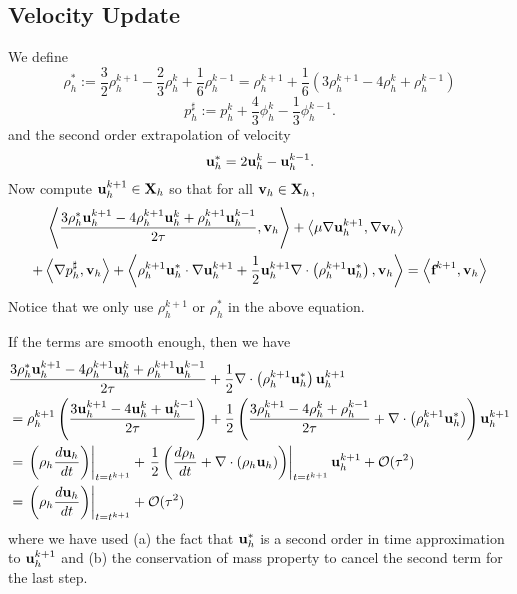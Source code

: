 \documentclass[letterpaper]{erdc}
\begin{document}
\subsection{Velocity Update}
We define
\begin{equation}
  \rho_h^{*} := \frac{3}{2}\rho_h^{k+1} - \frac{2}{3}\rho_h^{k} + \frac{1}{6}\rho_h^{k-1} = \rho_h^{k+1} + \frac{1}{6}\left(3\rho_h^{k+1} -4\rho_h^{k} + \rho_h^{k-1} \right)
\end{equation}
\begin{equation}
  p_h^{\sharp} := p_h^{k} + \frac{4}{3}\phi_h^{k} - \frac{1}{3}\phi_h^{k-1}.
\end{equation}
and the second order extrapolation of velocity
\begin{equation}
  \textbf{u}^{*}_h = 2\textbf{u}_h^{k}  - \textbf{u}_h^{k-1}.
\end{equation}
Now compute $\textbf{u}_h^{k+1}\in\textbf{X}_h$ so that for all $\textbf{v}_h\in\textbf{X}_h$,
\begin{equation}
  \begin{split}
    \left\langle \frac{3\rho_h^{*}\textbf{u}_h^{k+1} - 4\rho_h^{k+1}\textbf{u}_h^{k} + \rho_h^{k+1}\textbf{u}_h^{k-1}}{2\tau}, \textbf{v}_h \right\rangle  + \left\langle \mu\nabla\textbf{u}_h^{k+1}, \nabla\textbf{v}_h \right\rangle &\\
   + \left\langle \nabla p_h^{\sharp}, \textbf{v}_h \right\rangle + \left\langle \rho_h^{k+1}\textbf{u}_h^{*}\cdot\nabla\textbf{u}_h^{k+1} + \frac{1}{2}\textbf{u}_h^{k+1}\nabla\cdot\left( \rho_h^{k+1}\textbf{u}_h^{*} \right), \textbf{v}_h \right\rangle &= \left\langle \textbf{f}^{k+1}, \textbf{v}_h \right\rangle
  \end{split}
\end{equation}
Notice that we only use $\rho_h^{k+1}$ or $\rho_h^{*}$ in the above equation.

\begin{remark}
If the terms are smooth enough, then we have
\begin{align}
  &\frac{3\rho_h^{*}\textbf{u}_h^{k+1}-4\rho_h^{k+1}\textbf{u}_h^{k} +\rho_h^{k+1}\textbf{u}_h^{k-1}}{2\tau} +\frac{1}{2}\nabla\cdot\left(\rho_h^{k+1}\textbf{u}_h^{*}\right)\textbf{u}_h^{k+1}\\
   &= \rho_h^{k+1}\left(\frac{3\textbf{u}_h^{k+1} - 4\textbf{u}_h^{k} + \textbf{u}_h^{k-1}}{2\tau}\right) + \frac{1}{2} \left( \frac{3\rho_h^{k+1} -4\rho_h^{k} + \rho_h^{k-1}}{2\tau} + \nabla\cdot\left(\rho_h^{k+1}\textbf{u}_h^{*}\right)\right)\textbf{u}_h^{k+1}\\
  &= \left.\left(\rho_h\frac{d\textbf{u}_h}{dt} \right)\right|_{t=t^{k+1}} + \left.\frac{1}{2} \left( \frac{d\rho_h}{dt} +\nabla\cdot\left(\rho_h\textbf{u}_h\right)\right)\right|_{t=t^{k+1}}\textbf{u}_h^{k+1} + \mathcal{O}(\tau^2)\\
  &=\left.\left(\rho_h\frac{d\textbf{u}_h}{dt} \right)\right|_{t=t^{k+1}} + \mathcal{O}(\tau^{2})
\end{align}
where we have used (a) the fact that $\textbf{u}_h^{*}$ is a second order in time approximation to $\textbf{u}_h^{k+1}$ and (b) the conservation of mass property to cancel the second term for the last step.
\end{remark}
\end{document}
